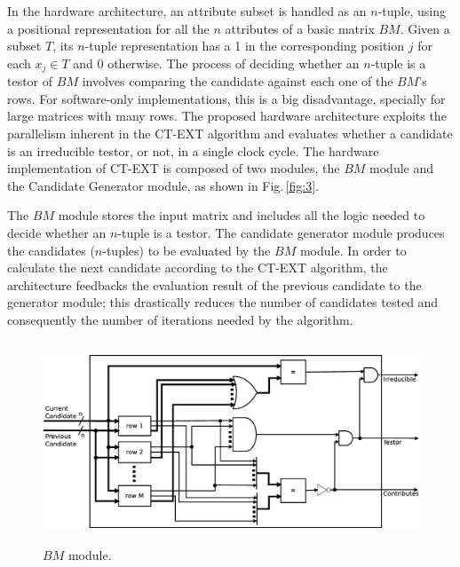 \documentclass[authoryear,preprint,review,12pt]{elsarticle}
\begin{document}
In the hardware architecture, an attribute subset is handled as an $n$-tuple, using a positional 
representation for all the $n$ attributes of a basic matrix $BM$. Given a subset $T$, its $n$-tuple representation 
has a 1 in the corresponding position $j$ for each $x_j \in T$ and 0 otherwise.
The process of deciding whether an $n$-tuple is a testor of $BM$ involves
comparing the candidate against each one of the $BM$'s rows. For
software-only implementations, this is a big disadvantage, specially for large 
matrices with many rows. The proposed hardware architecture exploits the parallelism 
inherent in the CT-EXT algorithm
and evaluates whether a candidate is an irreducible testor, or not, in a single
clock cycle. The hardware implementation of CT-EXT is composed of two modules, the $BM$ module and the Candidate Generator module, as shown in
Fig.\,\ref{fig:3}. 

The $BM$ module stores the input matrix and
includes all the logic needed to decide whether an $n$-tuple is a testor. The candidate
generator module produces the candidates ($n$-tuples) to be
evaluated by the $BM$ module. In order to calculate the next candidate
according to the CT-EXT algorithm, the architecture feedbacks the
evaluation result of the previous candidate to the generator module;
this drastically reduces the number of candidates tested and
consequently the number of iterations needed by the algorithm. 


\begin{figure}[htb]
    \begin{center}
        \includegraphics[height=6cm]{BM_module.eps}
    \end{center}
\caption{$BM$ module.}
\label{fig:4}
\end{figure}
\end{document}
